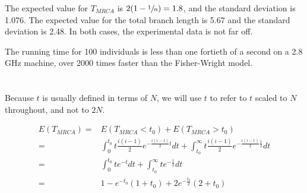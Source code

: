 \documentclass{article}
\begin{document}
The expected value for $T_{MRCA}$ is $2 (1 - \sfrac{1}{n}) = 1.8$, and the
standard deviation is 1.076.  The expected value for the total branch length is
5.67 and the standard deviation is 2.48.  In both cases, the experimental data
is not far off.

The running time for 100 individuals is less than one fortieth of a second on a
2.8 GHz machine, over 2000 times faster than the Fisher-Wright model.

\pagebreak


\section{}

Because $t$ is usually defined in terms of $N$, we will use $t$ to refer to $t$
scaled to $N$ throughout, and not to $2N$.

\begin{align*}
E(T_{MRCA}) =& E(T_{MRCA} < t_0) + E(T_{MRCA} > t_0) \\
            =& \int_0^{t_0} t \frac{i (i-1)}{2} e^{-\frac{i (i-1)}{2}t} dt +
               \int_{t_0}^{\infty} t\frac{i (i-1)}{2}
                    e^{-\frac{i (i-1)}{2}\frac{t}{2}} dt \\
            =& \int_0^{t_0} t e^{-t} dt +
               \int_{t_0}^{\infty} t e^{-\frac{t}{2}} dt \\
            =& 1-e^{-t_0} (1+t_0)+2 e^{-\frac{t_0}{2}} (2+t_0)
\end{align*}
\end{document}
